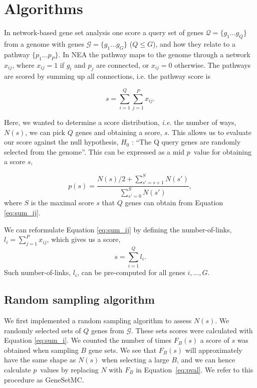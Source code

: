 \documentclass[a4paper,american]{lipics-v2016}
\begin{document}
\section*{Algorithms}

In network-based gene set analysis one score a query set of genes $ \mathcal{Q}=\{g_1 \ldots g_Q\} $ from a genome with genes $\mathcal{G}=\{g_1 \ldots g_G\}$ ($Q \le G$), and how they relate to a pathway $\{p_1 \ldots p_P\}$. In NEA the pathway maps to the genome through a network ${x_{ij}}$, where $x_{ij}=1$ if $g_i$ and $p_j$ are connected, or $x_{ij}=0$ otherwise. The pathways are scored by summing up all connections, i.e. the pathway score is

\begin{equation}
s=\sum_{i=1}^Q\sum_{j=1}^P x_{ij}.
\label{eq:sum_ij}
\end{equation}

Here, we wanted to determine a score distribution, {\em i.e.} the number of ways, $N(s)$, we can pick $Q$ genes and obtaining a score, $s$. This allows us to evaluate our score against the null hypothesis, $H_0$ : ``The Q query genes are randomly selected from the genome''. This can be expressed as a mid $p$~value\cite{lancaster1961significance,hwang2001optimality} for obtaining a score $s$,

\begin{equation}
p(s)=\frac{N(s)/2 +\sum_{s'=s+1}^{S} N(s')}{\sum_{s'=0}^{S} N(s')},
\label{eq:pval}
\end{equation}
where $S$ is the maximal score $s$ that $Q$ genes can obtain from Equation \ref{eq:sum_ij}.

We can reformulate Equation \ref{eq:sum_ij} by defining the number-of-links, $l_i=\sum_{j=1}^P x_{ij}$, which gives us a score,
\begin{equation}
s=\sum_{i=1}^Q l_i.
\label{eq:sum_i}
\end{equation}
Such number-of-links, $l_i$, can be pre-computed for all genes $i, \ldots, G$.

\subsection*{Random sampling algorithm}

We first implemented a random sampling algorithm to assess $N(s)$. We randomly selected sets of $Q$ genes from $\mathcal{G}$. These sets scores were calculated with Equation \ref{eq:sum_i}. We counted the number of times $F_B(s)$ a score of $s$ was obtained when sampling $B$ gene sets. We see that $F_B(s)$ will approximately have the same shape as $N(s)$ when selecting a large $B$, and we can hence calculate $p$~values by replacing $N$ with $F_B$ in Equation~\ref{eq:pval}. We refer to this procedure as GeneSetMC.
\end{document}
